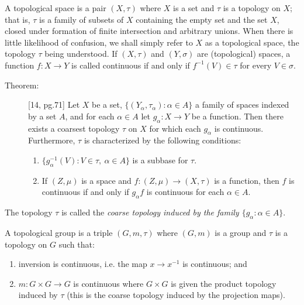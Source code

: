 \documentclass{article}
\begin{document}
A topological space is a pair $(X,\tau)$ where $X$ is a set and $\tau$ is a topology on $X$; that is, $\tau$ is a family of subsets of $X$ containing the empty set and the set $X$, closed under formation of finite intersection and arbitrary unions. When there is little likelihood of confusion, we shall simply refer to $X$ as a topological space, the topology $\tau$ being understood. If $(X,\tau)$ and $(Y,\sigma)$ are (topological) spaces, a function $f: X \rightarrow Y$ is called continuous if and only if $f^{-1}(V) \in \tau$ for every $V \in \sigma$.

\begin{description}

\item[Theorem:] [14, pg.71] Let $X$ be a set, $\{ (Y_{\alpha},\tau_{\alpha}): \alpha \in A \}$ a family of spaces indexed by a set $A$, and for each $\alpha \in A$ let $g_{\alpha}: X \rightarrow Y$ be a function. Then there exists a coarsest topology $\tau$ on $X$ for which each $g_{\alpha}$ is continuous. Furthermore, $\tau$ is characterized by the following conditions:
  \begin{enumerate}[\hspace{1cm}(i)]
    \item $\{ g_{\alpha}^{-1} (V): V \in \tau, \ \alpha \in A \}$ is a subbase for $\tau$.
    \item If $(Z,\mu)$ is a space and $f: (Z,\mu) \rightarrow (X,\tau)$ is a function, then $f$ is continuous if and only if $g_{\alpha} f$ is continuous for each $\alpha \in A$.
  \end{enumerate}

\end{description}

The topology $\tau$ is called the \emph{coarse topology induced by the family $\{g_{\alpha}:\alpha \in A\}$}.

A topological group is a triple $(G,m,\tau)$ where $(G,m)$ is a group and $\tau$ is a topology on $G$ such that:
\begin{enumerate}[\hspace{1cm}(i)]
  \item inversion is continuous, i.e. the map $x \rightarrow x^{-1}$ is continuous; and 
  \item $m: G \times G \rightarrow G$ is continuous where $G \times G$ is given the product topology induced by $\tau$ (this is the coarse topology induced by the projection maps).
\end{enumerate}
\end{document}
